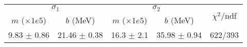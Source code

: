 \begin{tabular}{cc|cc||c}
\multicolumn{2}{c|}{$\sigma_1$} & \multicolumn{2}{|c}{$\sigma_2$}  & \multirow{2}{*}{$\chi^2/$ndf}\\
$m$ ($\times1e5$) & $b$ (MeV) & $m$ ($\times1e5$) & $b$ (MeV)  & \\
\hline
9.83 $\pm$ 0.86 & 21.46 $\pm$ 0.38 & 16.3 $\pm$ 2.1 & 35.98 $\pm$ 0.94 & 622/393\\
\end{tabular}
